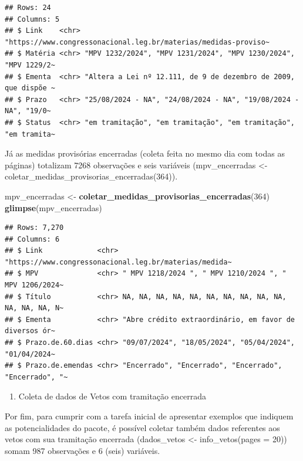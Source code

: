 \documentclass{article}
\newenvironment{Shaded}{\begin{snugshade}}{\end{snugshade}}
\newcommand{\DecValTok}[1]{\textcolor[rgb]{0.00,0.00,0.81}{#1}}
\newcommand{\FunctionTok}[1]{\textcolor[rgb]{0.13,0.29,0.53}{\textbf{#1}}}
\newcommand{\NormalTok}[1]{#1}
\newcommand{\OtherTok}[1]{\textcolor[rgb]{0.56,0.35,0.01}{#1}}
\providecommand{\tightlist}{%
  \setlength{\itemsep}{0pt}\setlength{\parskip}{0pt}}
\begin{document}
\begin{verbatim}
## Rows: 24
## Columns: 5
## $ Link    <chr> "https://www.congressonacional.leg.br/materias/medidas-proviso~
## $ Matéria <chr> "MPV 1232/2024", "MPV 1231/2024", "MPV 1230/2024", "MPV 1229/2~
## $ Ementa  <chr> "Altera a Lei nº 12.111, de 9 de dezembro de 2009, que dispõe ~
## $ Prazo   <chr> "25/08/2024 - NA", "24/08/2024 - NA", "19/08/2024 - NA", "19/0~
## $ Status  <chr> "em tramitação", "em tramitação", "em tramitação", "em tramita~
\end{verbatim}

Já as medidas provisórias encerradas (coleta feita no mesmo dia com
todas as páginas) totalizam 7268 observações e seis variáveis
(mpv\_encerradas \textless-
coletar\_medidas\_provisorias\_encerradas(364)).

\begin{Shaded}
\begin{Highlighting}[]
\NormalTok{mpv\_encerradas }\OtherTok{\textless{}{-}} \FunctionTok{coletar\_medidas\_provisorias\_encerradas}\NormalTok{(}\DecValTok{364}\NormalTok{)}
\FunctionTok{glimpse}\NormalTok{(mpv\_encerradas)}
\end{Highlighting}
\end{Shaded}

\begin{verbatim}
## Rows: 7,270
## Columns: 6
## $ Link             <chr> "https://www.congressonacional.leg.br/materias/medida~
## $ MPV              <chr> " MPV 1218/2024 ", " MPV 1210/2024 ", " MPV 1206/2024~
## $ Título           <chr> NA, NA, NA, NA, NA, NA, NA, NA, NA, NA, NA, NA, NA, N~
## $ Ementa           <chr> "Abre crédito extraordinário, em favor de diversos ór~
## $ Prazo.de.60.dias <chr> "09/07/2024", "18/05/2024", "05/04/2024", "01/04/2024~
## $ Prazo.de.emendas <chr> "Encerrado", "Encerrado", "Encerrado", "Encerrado", "~
\end{verbatim}

\begin{enumerate}
\def\labelenumi{\arabic{enumi}.}
\setcounter{enumi}{2}
\tightlist
\item
  Coleta de dados de Vetos com tramitação encerrada
\end{enumerate}

Por fim, para cumprir com a tarefa inicial de apresentar exemplos que
indiquem as potencialidades do pacote, é possível coletar também dados
referentes aos vetos com sua tramitação encerrada (dados\_vetos
\textless- info\_vetos(pages = 20)) somam 987 observações e 6 (seis)
variáveis.
\end{document}
